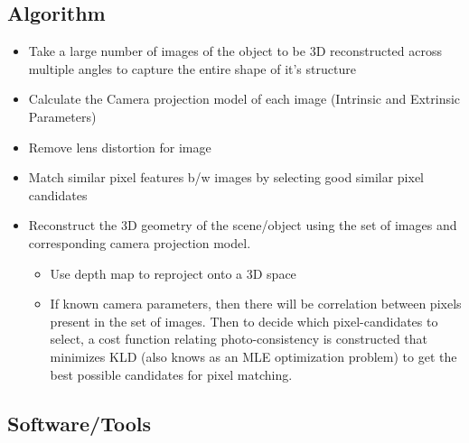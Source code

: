 \documentclass{article}[11pt]
\begin{document}
\subsection{Algorithm}
\begin{itemize}
    \item Take a large number of images of the object to be 3D reconstructed across multiple angles to capture the entire shape of it's structure
    \item Calculate the Camera projection model of each image (Intrinsic and Extrinsic Parameters)
    \item Remove lens distortion for image
    \item Match similar pixel features b/w images by selecting good similar pixel candidates
    \item Reconstruct the 3D geometry of the scene/object using the set of images
    and corresponding camera projection model.
    \begin{itemize}
        \item Use depth map to reproject onto a 3D space
        \item If known camera parameters, then there will be correlation between pixels present in the set of images. Then to decide which pixel-candidates to select, a cost function relating photo-consistency is constructed that minimizes KLD (also knows as an MLE optimization problem) to get the best possible candidates for pixel matching.
    \end{itemize}
    
\end{itemize}


\subsection{Software/Tools}
\end{document}
